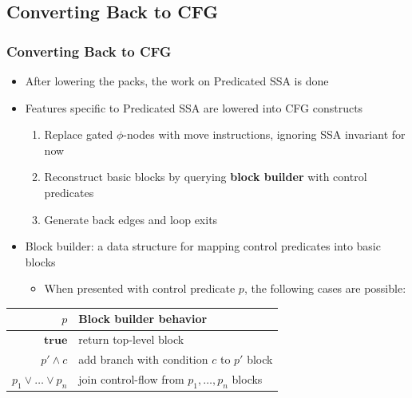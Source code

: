 \documentclass[aspectratio=169]{beamer}
\begin{document}
\subsection{Converting Back to CFG}
\begin{frame}
  \frametitle{Converting Back to CFG}

  \begin{itemize}
    \item After lowering the packs, the work on Predicated SSA is done
    \pause
    \item Features specific to Predicated SSA are lowered into CFG constructs
    \begin{enumerate}
      \item Replace gated \(\phi\)-nodes with move instructions, ignoring SSA invariant for now
      \item Reconstruct basic blocks by querying {\bfseries block builder} with control predicates
      \item Generate back edges and loop exits
    \end{enumerate}
    \pause
    \item Block builder: a data structure for mapping control predicates into basic blocks
    \begin{itemize}
      \item When presented with control predicate \(p\), the following cases are possible:
    \end{itemize}
  \end{itemize}

  \begin{table}[]
  \begin{tabular}{|r|l|}
  \hline
  \(p\) & Block builder behavior \\ \hline
  \(\mathbf{true}\) & return top-level block \\
  \(p' \land c\) & add branch with condition \(c\) to \(p'\) block \\
  \(p_1 \lor \dots \lor p_n\) & join control-flow from \(p_1, \dots, p_n\) blocks \\ \hline
  \end{tabular}
  \end{table}
\end{frame}
\end{document}
